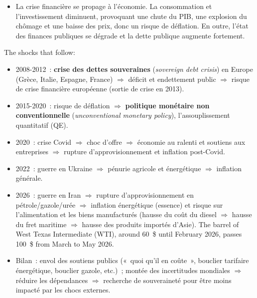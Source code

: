 \begin{example}
\begin{itemize}
    des interdépendances entre acteurs, secteurs et économies~; un effet de contagion
    menace la stabilité du système financier mondial. La méfiance s'installe entre les
    banques, paralysant le marché interbancaire. Elles refusent de se prêter de
    l'argent et la moindre rumeur entraîne des flux de retraits significatifs de la
    part de nombreux investisseurs. Fragilisées, elles accordent aussi moins de crédits
    aux ménages et entreprises.
  \item La crise financière se propage à l'économie. La consommation et l'investissement
    diminuent, provoquant une chute du PIB, une explosion du chômage et une baisse des
    prix, donc un risque de déflation. En outre, l'état des finances publiques se
    dégrade et la dette publique augmente fortement.
\end{itemize}
\end{example}

The shocks that follow:
\begin{itemize}
  \item 2008-2012~: \textbf{crise des dettes souveraines} (\textit{sovereign debt
    crisis}) en Europe (Grèce, Italie, Espagne, France) $\Rightarrow$ déficit et
    endettement public $\Rightarrow$ risque de crise financière européenne (sortie de
    crise en 2013).
  \item 2015-2020~: risque de déflation $\Rightarrow$ \textbf{politique monétaire non
    conventionnelle} (\textit{unconventional monetary policy}), l'assouplissement
    quantitatif (QE).
  \item 2020~: crise Covid $\Rightarrow$ choc d'offre $\Rightarrow$ économie au ralenti
    et soutiens aux entreprises $\Rightarrow$ rupture d'approvisionnement et inflation
    post-Covid.
  \item 2022~: guerre en Ukraine $\Rightarrow$ pénurie agricole et énergétique
    $\Rightarrow$ inflation générale.
  \item 2026~: guerre en Iran $\Rightarrow$ rupture d'approvisionnement en
    pétrole/gazole/urée $\Rightarrow$ inflation énergétique (essence) et risque sur
    l'alimentation et les biens manufacturés (hausse du coût du diesel $\Rightarrow$
    hausse du fret maritime $\Rightarrow$ hausse des produits importés d'Asie). The
    barrel of West Texas Intermediate (WTI), around 60~\$ until February 2026, passes
    100~\$ from March to May 2026.
  \item Bilan~: envol des soutiens publics («~quoi qu'il en coûte~», bouclier tarifaire
    énergétique, bouclier gazole, etc.)~; montée des incertitudes mondiales
    $\Rightarrow$ réduire les dépendances $\Rightarrow$ recherche de souveraineté pour
    être moins impacté par les chocs externes.
\end{itemize}

